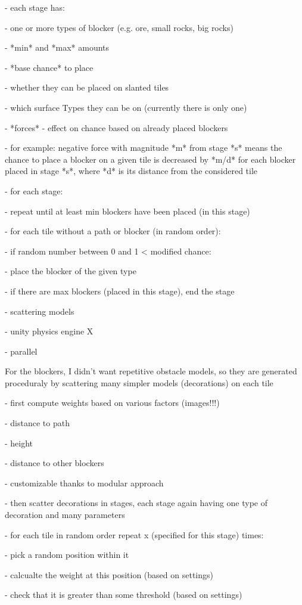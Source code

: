 - each stage has:

- one or more types of blocker (e.g. ore, small rocks, big rocks)

- *min* and *max* amounts

- *base chance* to place

- whether they can be placed on slanted tiles

- which surface Types they can be on (currently there is only one)

- *forces* - effect on chance based on already placed blockers

- for example: negative force with magnitude *m* from stage *s* means the chance to place a blocker on a given tile is decreased by *m/d*  for each blocker placed in stage *s*, where *d* is its distance from the considered tile

- for each stage:

- repeat until at least min blockers have been placed (in this stage)

- for each tile without a path or blocker (in random order):

- if random number between 0 and 1 < modified chance:

- place the blocker of the given type

- if there are max blockers (placed in this stage), end the stage

- scattering models

- unity physics engine X

- parallel

For the blockers, I didn't want repetitive obstacle models, so they are generated proceduraly by scattering many simpler models (decorations) on each tile

- first compute weights based on various factors (images!!!)

- distance to path

- height

- distance to other blockers

- customizable thanks to modular approach

- then scatter decorations in stages, each stage again having one type of decoration and many parameters

- for each tile in random order repeat x (specified for this stage) times:

- pick a random position within it

- calcualte the weight at this position (based on settings)

- check that it is greater than some threshold (based on settings)

